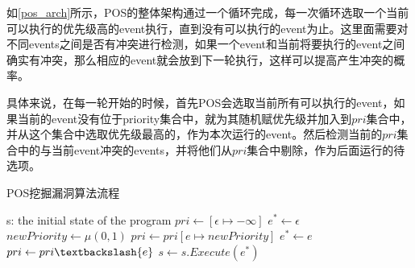 如\autoref{pos_arch}所示，POS的整体架构通过一个循环完成，每一次循环选取一个当前可以执行的优先级高的event执行，直到没有可以执行的event为止。这里面需要对不同events之间是否有冲突进行检测，如果一个event和当前将要执行的event之间确实有冲突，那么相应的event就会放到下一轮执行，这样可以提高产生冲突的概率。

具体来说，在每一轮开始的时候，首先POS会选取当前所有可以执行的event，如果当前的event没有位于priority集合中，就为其随机赋优先级并加入到$pri$集合中，并从这个集合中选取优先级最高的，作为本次运行的event。然后检测当前的$pri$集合中的与当前event冲突的events，并将他们从$pri$集合中剔除，作为后面运行的待选项。

\begin{algorithm}[!ht]
\caption{POS挖掘漏洞算法流程}
\label{pos_arch}
\begin{algorithmic}[1]
    \REQUIRE  s: the initial state of the program
    \STATE $pri \leftarrow [\epsilon \mapsto -\infty ]$
        \STATE $e^* \leftarrow \epsilon$
                \STATE $newPriority \leftarrow \mu(0, 1)$
                \STATE $pri \leftarrow pri[e \mapsto newPriority]$
            \ENDIF
                \STATE $e^* \leftarrow e$
            \ENDIF
        \ENDFOR
                \STATE $pri \leftarrow pri \textbackslash \{e\}$
            \ENDIF
        \ENDFOR
        \STATE $s \leftarrow s.Execute(e^*)$
    \ENDWHILE
\end{algorithmic}  
\end{algorithm}